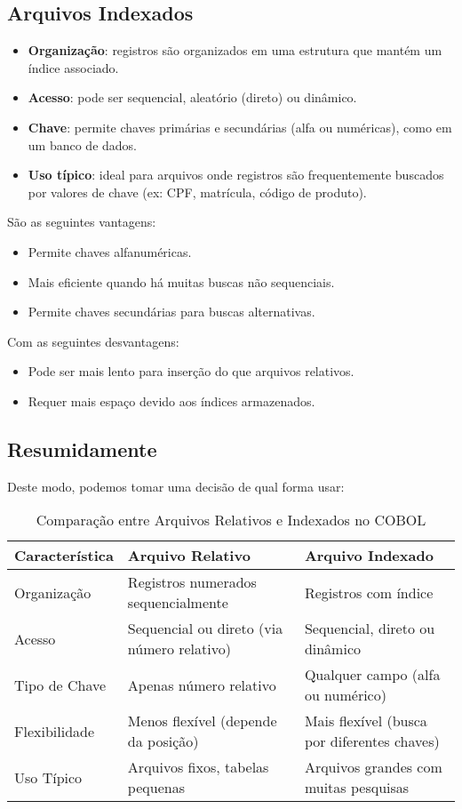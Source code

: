 \subsection{Arquivos Indexados}
\begin{itemize}
	\item \textbf{Organização}: registros são organizados em uma estrutura que mantém um índice associado.
	\item \textbf{Acesso}: pode ser sequencial, aleatório (direto) ou dinâmico.
	\item \textbf{Chave}: permite chaves primárias e secundárias (alfa ou numéricas), como em um banco de dados.
	\item \textbf{Uso típico}: ideal para arquivos onde registros são frequentemente buscados por valores de chave (ex: CPF, matrícula, código de produto).
\end{itemize}
São as seguintes vantagens: \vspace{-1em}
\begin{itemize}
	\item Permite chaves alfanuméricas.
	\item Mais eficiente quando há muitas buscas não sequenciais.
	\item Permite chaves secundárias para buscas alternativas.
\end{itemize}
Com as seguintes desvantagens: \vspace{-1em}
\begin{itemize}
	\item Pode ser mais lento para inserção do que arquivos relativos.
	\item Requer mais espaço devido aos índices armazenados.
\end{itemize}

\subsection{Resumidamente}
Deste modo, podemos tomar uma decisão de qual forma usar:
\begin{table}[h]
	\centering
	\renewcommand{\arraystretch}{1.3} %
	\begin{tabular}{|l|l|l|}
		\hline
		\textbf{Característica} & \textbf{Arquivo Relativo} & \textbf{Arquivo Indexado} \\
		\hline
		Organização & Registros numerados sequencialmente & Registros com índice \\
		\hline
		Acesso & Sequencial ou direto (via número relativo) & Sequencial, direto ou dinâmico \\
		\hline
		Tipo de Chave & Apenas número relativo & Qualquer campo (alfa ou numérico) \\
		\hline
		Flexibilidade & Menos flexível (depende da posição) & Mais flexível (busca por diferentes chaves) \\
		\hline
		Uso Típico & Arquivos fixos, tabelas pequenas & Arquivos grandes com muitas pesquisas \\
		\hline
	\end{tabular}
	\caption{Comparação entre Arquivos Relativos e Indexados no COBOL}
	\label{tab:comparacao-arquivos}
\end{table}

\clearpage
